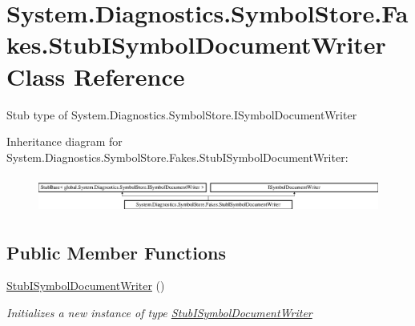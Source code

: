 \hypertarget{class_system_1_1_diagnostics_1_1_symbol_store_1_1_fakes_1_1_stub_i_symbol_document_writer}{\section{System.\-Diagnostics.\-Symbol\-Store.\-Fakes.\-Stub\-I\-Symbol\-Document\-Writer Class Reference}
\label{class_system_1_1_diagnostics_1_1_symbol_store_1_1_fakes_1_1_stub_i_symbol_document_writer}
}


Stub type of System.\-Diagnostics.\-Symbol\-Store.\-I\-Symbol\-Document\-Writer 


Inheritance diagram for System.\-Diagnostics.\-Symbol\-Store.\-Fakes.\-Stub\-I\-Symbol\-Document\-Writer\-:\begin{figure}[H]
\begin{center}
\leavevmode
\includegraphics[height=1.225383cm]{class_system_1_1_diagnostics_1_1_symbol_store_1_1_fakes_1_1_stub_i_symbol_document_writer}
\end{center}
\end{figure}
\subsection*{Public Member Functions}
\begin{DoxyCompactItemize}
\item 
\hyperlink{class_system_1_1_diagnostics_1_1_symbol_store_1_1_fakes_1_1_stub_i_symbol_document_writer_ac2851495fb1e17a19a78ec232ba04994}{Stub\-I\-Symbol\-Document\-Writer} ()
\begin{DoxyCompactList}\small\item\em Initializes a new instance of type \hyperlink{class_system_1_1_diagnostics_1_1_symbol_store_1_1_fakes_1_1_stub_i_symbol_document_writer}{Stub\-I\-Symbol\-Document\-Writer}\end{DoxyCompactList}\end{DoxyCompactItemize}
